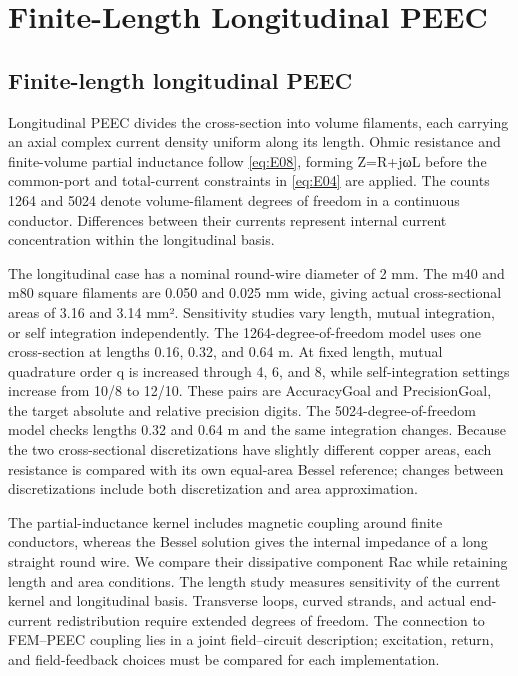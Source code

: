 \section{Finite-Length Longitudinal PEEC}
\label{chapter:06}

\hypertarget{06.peec_method.heading}{}
\subsection{Finite-length longitudinal PEEC}

\hypertarget{06.peec_method.p1}{}
Longitudinal PEEC divides the cross-section into volume filaments, each carrying an axial complex current density uniform along its length. Ohmic resistance and finite-volume partial inductance follow \eqref{eq:E08}, forming Z=R+jωL before the common-port and total-current constraints in \eqref{eq:E04} are applied. The counts 1264 and 5024 denote volume-filament degrees of freedom in a continuous conductor. Differences between their currents represent internal current concentration within the longitudinal basis.

\hypertarget{06.peec_method.p2}{}
The longitudinal case has a nominal round-wire diameter of 2 mm. The m40 and m80 square filaments are 0.050 and 0.025 mm wide, giving actual cross-sectional areas of 3.16 and 3.14 mm². Sensitivity studies vary length, mutual integration, or self integration independently. The 1264-degree-of-freedom model uses one cross-section at lengths 0.16, 0.32, and 0.64 m. At fixed length, mutual quadrature order q is increased through 4, 6, and 8, while self-integration settings increase from 10/8 to 12/10. These pairs are AccuracyGoal and PrecisionGoal, the target absolute and relative precision digits. The 5024-degree-of-freedom model checks lengths 0.32 and 0.64 m and the same integration changes. Because the two cross-sectional discretizations have slightly different copper areas, each resistance is compared with its own equal-area Bessel reference; changes between discretizations include both discretization and area approximation.

\hypertarget{06.peec_method.p3}{}
The partial-inductance kernel includes magnetic coupling around finite conductors, whereas the Bessel solution gives the internal impedance of a long straight round wire. We compare their dissipative component Rac while retaining length and area conditions. The length study measures sensitivity of the current kernel and longitudinal basis. Transverse loops, curved strands, and actual end-current redistribution require extended degrees of freedom. The connection to FEM–PEEC coupling \cite{P03} lies in a joint field–circuit description; excitation, return, and field-feedback choices must be compared for each implementation.

